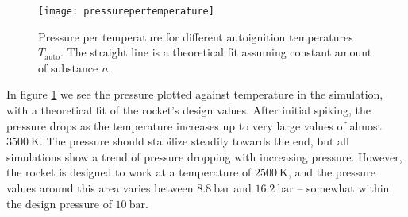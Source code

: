   \begin{figure}
  	\centering
  	\texttt{[image: pressurepertemperature]}
  	\caption{Pressure per temperature for different autoignition temperatures $T_\text{auto}$. The straight line is a theoretical fit assuming constant amount of substance $n$.}
  	\label{fig:pressurepertemperature}
  \end{figure}

  In figure \ref{fig:pressurepertemperature} we see the pressure plotted against temperature in the simulation, with a theoretical fit of the rocket's design values. After initial spiking, the pressure drops as the temperature increases up to very large values of almost $\SI{3500}{\kelvin}$. The pressure should stabilize steadily towards the end, but all simulations show a trend of pressure dropping with increasing pressure. However, the rocket is designed to work at a temperature of $\SI{2500}{\kelvin}$, and the pressure values around this area varies between $\SI{8.8}{\bar}$ and $\SI{16.2}{\bar}$ -- somewhat within the design pressure of $\SI{10}{\bar}$.

